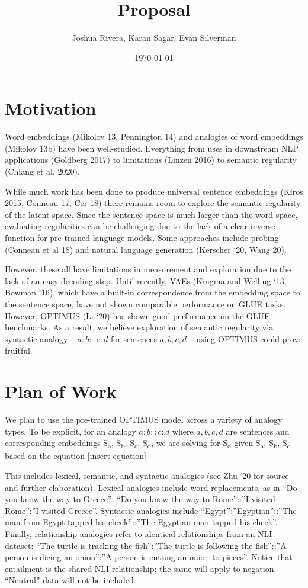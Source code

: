\documentclass[11pt]{article}
\author{Joshua Rivera, Karan Sagar, Evan Silverman}
\date{\today}
\title{Proposal}
\begin{document}
\maketitle
\tableofcontents


\section{Motivation}
\label{sec:org1392bbe}
Word embeddings (Mikolov 13, Pennington 14) and analogies of word embeddings (Mikolov 13b) have been well-studied. Everything from uses in downstream NLP applications (Goldberg 2017) to limitations (Linzen 2016) to semantic regularity (Chiang et al, 2020).

While much work has been done to produce universal sentence embeddings (Kiros 2015, Conneau 17, Cer 18) there remains room to explore the semantic regularity of the latent space. Since the sentence space is much larger than the word space, evaluating regularities can be challenging due to the lack of a clear inverse function for pre-trained language models. Some approaches include probing (Conneau et al 18) and natural language generation (Kerscher ‘20, Wang 20).

However, these all have limitations in measurement and exploration due to the lack of an easy decoding step. Until recently, VAEs (Kingma and Welling ‘13, Bowman ‘16), which have a built-in correspondence from the embedding space to the sentence space, have not shown comparable performance on GLUE tasks. However, OPTIMUS (Li ‘20) has shown good performance on the GLUE benchmarks. As a result, we believe exploration of semantic regularity via syntactic analogy -- \(a:b::c:d\) for sentences \(a, b, c, d\)  -- using OPTIMUS could prove fruitful.
\section{Plan of Work}
\label{sec:orgb8c9bd4}
We plan to use the pre-trained OPTIMUS model across a variety of analogy types. To be explicit, for an analogy \(a:b::c:d\) where \(a, b, c, d\) are sentences and corresponding embeddings S\textsubscript{a}, S\textsubscript{b}, S\textsubscript{c}, S\textsubscript{d}, we are solving for S\textsubscript{d} given S\textsubscript{a}, S\textsubscript{b}, S\textsubscript{c} based on the equation [insert equation]

This includes lexical, semantic, and syntactic analogies (see Zhu ‘20 for source and further elaboration). Lexical analogies include word replacements, as in “Do you know the way to Greece”: “Do you know the way to Rome”::”I visited Rome”:”I visited Greece”. Syntactic analogies include “Egypt”:”Egyptian”::”The man from Egypt tapped his cheek”::”The Egyptian man tapped his cheek”. Finally, relationship analogies refer to identical relationships from an NLI dataset: “The turtle is tracking the fish”:”The turtle is following the fish”::”A person is dicing an onion”:”A person is cutting an onion to pieces”. Notice that entailment is the shared NLI relationship; the same will apply to negation. “Neutral” data will not be included.
\end{document}
